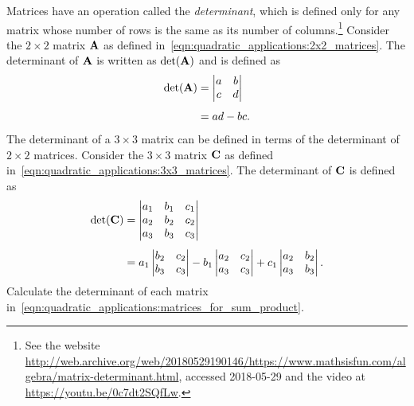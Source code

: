 \documentclass[a4paper,oneside,12pt]{article}
\begin{document}
\begin{problem}
\begin{packedenum}
  \item\label{subprob:quadratic_applications:matrix_determinant}
    Matrices have an operation called the \emph{determinant}, which is
    defined only for any matrix whose number of rows is the same as
    its number of columns.\footnote{
      See the website
      \url{http://web.archive.org/web/20180529190146/https://www.mathsisfun.com/algebra/matrix-determinant.html},
      accessed 2018-05-29 and the video at
      \url{https://youtu.be/0c7dt2SQfLw}.
    }
    Consider the $2 \times 2$ matrix $\textbf{A}$ as defined
    in~\eqref{eqn:quadratic_applications:2x2_matrices}.  The
    determinant of $\textbf{A}$ is written as $\det(\textbf{A})$ and is defined
    as
    \begin{align*}
    \det(\textbf{A})
    &=
    \begin{vmatrix}
    a & b \\
    c & d
    \end{vmatrix} \\[4pt]
    &=
    ad - bc.
    \end{align*}
    The determinant of a $3 \times 3$ matrix can be defined in terms
    of the determinant of $2 \times 2$ matrices.  Consider the
    $3 \times 3$ matrix $\textbf{C}$ as defined
    in~\eqref{eqn:quadratic_applications:3x3_matrices}.  The
    determinant of $\textbf{C}$ is defined as
    \begin{align*}
    \det(\textbf{C})
    &=
    \begin{vmatrix}
    a_1 & b_1 & c_1 \\
    a_2 & b_2 & c_2 \\
    a_3 & b_3 & c_3
    \end{vmatrix} \\[4pt]
    &=
    a_1
    \begin{vmatrix}
    b_2 & c_2 \\
    b_3 & c_3
    \end{vmatrix}
    -
    b_1
    \begin{vmatrix}
    a_2 & c_2 \\
    a_3 & c_3
    \end{vmatrix}
    +
    c_1
    \begin{vmatrix}
    a_2 & b_2 \\
    a_3 & b_3
    \end{vmatrix}.
    \end{align*}
    Calculate the determinant of each matrix
    in~\eqref{eqn:quadratic_applications:matrices_for_sum_product}.


\end{packedenum}
\end{problem}
\end{document}
